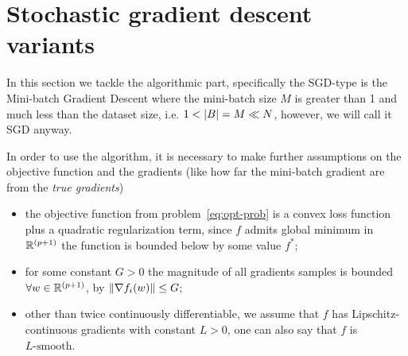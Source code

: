 \section{Stochastic gradient descent variants}\label{sc:sgds}

In this section we tackle the algorithmic part, specifically the SGD-type is the Mini-batch Gradient Descent where the mini-batch size $M$ is greater than 1 and much less than the dataset size, i.e. $1<\lvert B\rvert=M\ll N$, however, we will call it SGD anyway.



In order to use the algorithm, it is necessary to make further assumptions on the objective function and the gradients (like how far the mini-batch gradient are from the \emph{true gradients})
\begin{itemize}
\item the objective function from problem~\eqref{eq:opt-prob} is a convex loss function plus a quadratic regularization term, since $f$ admits global minimum in $\mathbb{R}^{(p+1)}$ the function is bounded below by some value $f^\ast$;%
\item for some constant $G>0$ the magnitude of all gradients samples is bounded $\forall w\in\mathbb{R}^{(p+1)}$, by $\lVert\nabla f_i(w)\rVert\leq G$;
\item other than twice continuously differentiable, we assume that $f$ has Lipschitz-continuous gradients with constant $L>0$, one can also say that $f$ is $L\text{-smooth}$.
\end{itemize}

